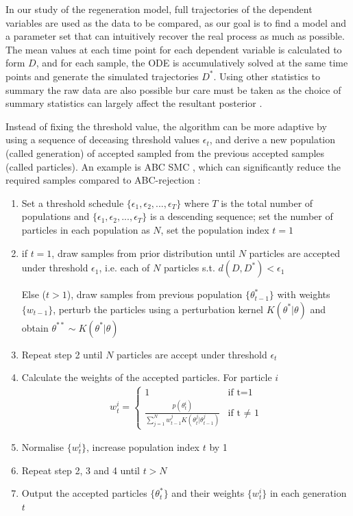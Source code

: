 \documentclass[12pt,a4paper]{report}
\begin{document}
In our study of the regeneration model, full trajectories of the dependent variables are used as the data to be compared, as our goal is to find a model and a parameter set that can intuitively recover the real process as much as possible. The mean values at each time point for each dependent variable is calculated to form $D$, and for each sample, the ODE is accumulatively solved at the same time points and generate the simulated trajectories $D^*$. Using other statistics to summary the raw data are also possible bur care must be taken as the choice of summary statistics can largely affect the resultant posterior \cite{summaryD, summaryD2}.

Instead of fixing the threshold value, the algorithm can be more adaptive by using a sequence of deceasing threshold values $\epsilon_t$, and derive a new population (called generation) of accepted sampled from the previous accepted samples (called particles). An example is ABC SMC \cite{Toni}, which can significantly reduce the required samples compared to ABC-rejection \cite{ref:disease}:

\begin{enumerate}
    \item Set a threshold schedule $\{\epsilon_1, \epsilon_2, ..., \epsilon_T\}$ where $T$ is the total number of populations and $\{\epsilon_1, \epsilon_2, ..., \epsilon_T\}$ is a descending sequence; set the number of particles in each population as $N$, set the population index $t=1$
    \item if $t=1$, draw samples from prior distribution until $N$ particles are accepted under threshold $\epsilon_1$, i.e. each of $N$ particles s.t. $d(D,D^*)<\epsilon_1$
    
    Else ($t>1$), draw samples from previous population $\{\theta^*_{t-1}\}$ with weights $\{w_{t-1}\}$, perturb the particles using a perturbation kernel $K(\theta^*|\theta)$ and obtain $\theta^{**}\sim K(\theta^*|\theta)$
    \item Repeat step 2 until $N$ particles are accept under threshold $\epsilon_t$
    \item Calculate the weights of the accepted particles. For particle $i$ 
    \begin{align}
        \label{eq:weight}
        w^i_t =\begin{cases}
            1 & \text{if t=1} \\
            \frac{p(\theta^i_t)}{\sum_{j=1}^{N} w^j_{t-1}K(\theta^j_t|\theta^j_{t-1})} & \text{if t $\neq$ 1} 
        \end{cases}
    \end{align}
    
    \item Normalise $\{w^i_t\}$, increase population index $t$ by 1
    \item Repeat step 2, 3 and 4 until $t>N$
    \item Output the accepted particles $\{\theta^*_{t}\}$ and their weights $\{w^i_t\}$ in each generation $t$

\end{enumerate}
\end{document}
